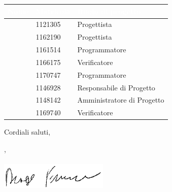 \documentclass[12pt,a4paper]{letter}
\begin{document}
\begin{letter}
        {
            \renewcommand{\arraystretch}{1.5}
            \begin{longtable}{ C{4cm} C{3cm} C{6cm} }
                \textcolor{white}{\textbf{Nome}} & \textcolor{white}{\textbf{Matricola}} & \textcolor{white}{\textbf{Ruolo di progetto}}\\
                \endhead 
                \MC{} & 1121305 & Progettista \\
                \LD{} & 1162190 & Progettista \\
                \CE{} & 1161514 & Programmatore \\
                \SE{} & 1166175 & Verificatore \\
                \PF{} & 1170747 & Programmatore \\
                \DF{} & 1146928 & Responsabile di Progetto \\
                \BR{} & 1148142 & Amministratore di Progetto \\
                \AT{} & 1169740 & Verificatore \\  
            \end{longtable}
        }
        Cordiali saluti,
        \closing{\DF{}, \\ \textit{\Responsabile{}}\\ \includegraphics[width=.6\linewidth]{../DocumentazioneEsterna/PianoDiProgetto/Sezioni/Immagini/Firme/Francesco.png}}

    \end{letter}
\end{document}
